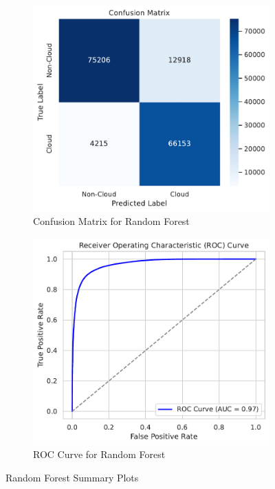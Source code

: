 \documentclass[11pt,letterpaper]{article}
\begin{document}
\begin{figure}[H]
  \centering
  \begin{subfigure}[b]{0.48\textwidth}
      \centering
      \includegraphics[width=\textwidth]{figs/rf1.pdf}
      \caption{Confusion Matrix for Random Forest}
      \label{fig:RF_CM}
  \end{subfigure}
  \hfill
  \begin{subfigure}[b]{0.48\textwidth}
      \centering
      \includegraphics[width=\textwidth]{figs/rf2.pdf}
      \caption{ROC Curve for Random Forest}
      \label{fig:RF_ROC}
  \end{subfigure}
  \caption{Random Forest Summary Plots}
  \label{fig:RF_plots}
\end{figure}\noindent
\end{document}
